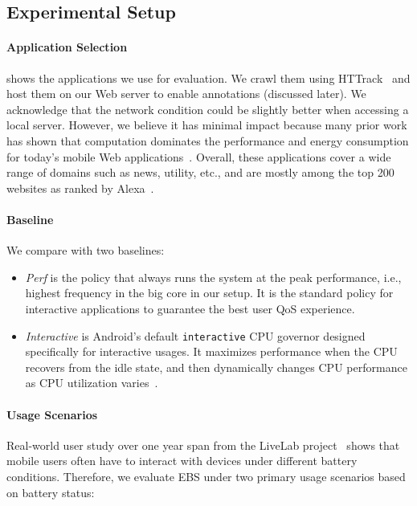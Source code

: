 \subsection{Experimental Setup}
\paragraph{Application Selection}  shows the applications we use for evaluation. We crawl them using HTTrack~\cite{httrack} and host them on our Web server to enable annotations (discussed later). We acknowledge that the network condition could be slightly better when accessing a local server. However, we believe it has minimal impact because many prior work has shown that computation dominates the performance and energy consumption for today's mobile Web applications~\cite{zhu2015role,huang2012close,big-little}. Overall, these applications cover a wide range of domains such as news, utility, etc., and are mostly among the top 200 websites as ranked by Alexa~\cite{alexa}.

\paragraph{Baseline} We compare \ebs with two baselines:
\begin{itemize}
  \item \textit{Perf} is the policy that always runs the system at the peak performance, i.e., highest frequency in the big core in our setup. It is the standard policy for interactive applications to guarantee the best user QoS experience.
  
  \item \textit{Interactive} is Android's default \texttt{interactive} CPU governor designed specifically for interactive usages. It maximizes performance when the CPU recovers from the idle state, and then dynamically changes CPU performance as CPU utilization varies~\cite{android_cpufreq}.
\end{itemize}

\paragraph{Usage Scenarios} Real-world user study over one year span from the LiveLab project~\cite{livelab} shows that mobile users often have to interact with devices under different battery conditions. Therefore, we evaluate EBS under two primary usage scenarios based on battery status:

